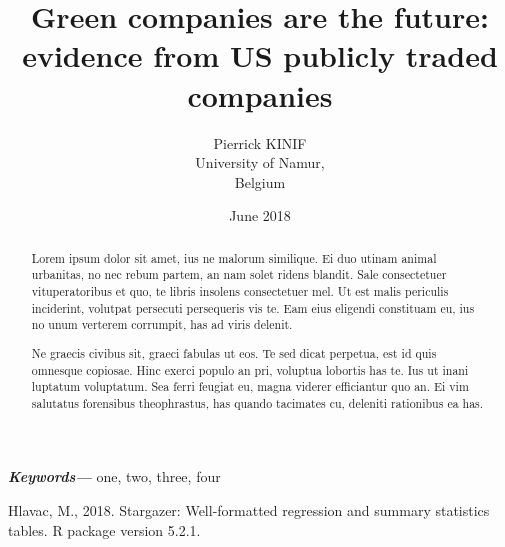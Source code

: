 \documentclass[12pt,]{article}
\title{}
\author{}
\date{}
\begin{document}
\begin{centering}
\huge
\title{Green companies are the future: evidence from US publicly traded companies}
\author{Pierrick KINIF\\
   University of Namur,\\
   Belgium}
\date{June 2018}
\maketitle

\normalsize
\begin{abstract}
Lorem ipsum dolor sit amet, ius ne malorum similique. Ei duo utinam animal urbanitas, no nec rebum partem, an nam solet ridens blandit. Sale consectetuer vituperatoribus et quo, te libris insolens consectetuer mel. Ut est malis periculis inciderint, volutpat persecuti persequeris vis te. Eam eius eligendi constituam eu, ius no unum verterem corrumpit, has ad viris delenit.

Ne graecis civibus sit, graeci fabulas ut eos. Te sed dicat perpetua, est id quis omnesque copiosae. Hinc exerci populo an pri, voluptua lobortis has te. Ius ut inani luptatum voluptatum. Sea ferri feugiat eu, magna viderer efficiantur quo an. Ei vim salutatus forensibus theophrastus, has quando tacimates cu, deleniti rationibus ea has.
\end{abstract}
\providecommand{\keywords}[1]
{
  \small    
  \textbf{\textit{Keywords---}} #1
}
\keywords{one, two, three, four}
\end{centering}

\hypertarget{refs}{}
\hypertarget{ref-Hlavac2018}{}
Hlavac, M., 2018. Stargazer: Well-formatted regression and summary
statistics tables. R package version 5.2.1.
\end{document}

